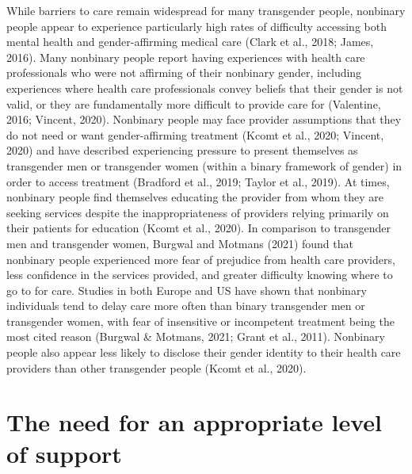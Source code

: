 \documentclass[
]{book}
\begin{document}
While barriers to care remain widespread for
many transgender people, nonbinary people
appear to experience particularly high rates of
difficulty accessing both mental health and
gender-affirming medical care (Clark et al., 2018;
James, 2016). Many nonbinary people report having experiences with health care professionals
who were not affirming of their nonbinary gender, including experiences where health care professionals convey beliefs that their gender is not
valid, or they are fundamentally more difficult
to provide care for (Valentine, 2016; Vincent,
2020). Nonbinary people may face provider
assumptions that they do not need or want
gender-affirming treatment (Kcomt et al., 2020;
Vincent, 2020) and have described experiencing
pressure to present themselves as transgender
men or transgender women (within a binary
framework of gender) in order to access treatment (Bradford et al., 2019; Taylor et al., 2019).
At times, nonbinary people find themselves educating the provider from whom they are seeking
services despite the inappropriateness of providers
relying primarily on their patients for education
(Kcomt et al., 2020). In comparison to transgender men and transgender women, Burgwal and
Motmans (2021) found that nonbinary people
experienced more fear of prejudice from health
care providers, less confidence in the services
provided, and greater difficulty knowing where
to go to for care. Studies in both Europe and US
have shown that nonbinary individuals tend to
delay care more often than binary transgender
men or transgender women, with fear of insensitive or incompetent treatment being the most
cited reason (Burgwal \& Motmans, 2021; Grant
et al., 2011). Nonbinary people also appear less
likely to disclose their gender identity to their
health care providers than other transgender people (Kcomt et al., 2020).

\hypertarget{the-need-for-an-appropriate-level-of-support}{%
\section*{The need for an appropriate level of support}\label{the-need-for-an-appropriate-level-of-support}}
\end{document}
